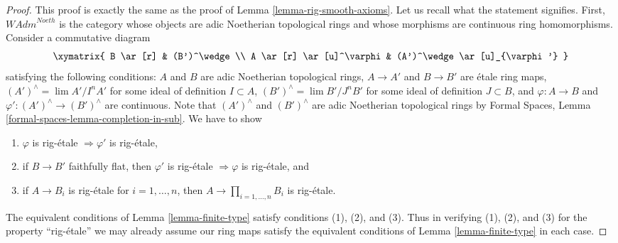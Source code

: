 \begin{proof}
This proof is exactly the same as the proof of
Lemma \ref{lemma-rig-smooth-axioms}.
Let us recall what the statement signifies. First, 
$\textit{WAdm}^{Noeth}$ is the category whose objects are
adic Noetherian topological rings and whose morphisms are
continuous ring homomorphisms. Consider a commutative diagram
$$
\xymatrix{
B \ar[r] & (B')^\wedge \\
A \ar[r] \ar[u]^\varphi & (A')^\wedge \ar[u]_{\varphi'}
}
$$
satisfying the following conditions:
$A$ and $B$ are adic Noetherian topological rings,
$A \to A'$ and $B \to B'$ are \'etale ring maps,
$(A')^\wedge = \lim A'/I^nA'$ for some ideal of definition $I \subset A$,
$(B')^\wedge = \lim B'/J^nB'$ for some ideal of definition $J \subset B$, and
$\varphi : A \to B$ and $\varphi' : (A')^\wedge \to (B')^\wedge$
are continuous. Note that $(A')^\wedge$ and $(B')^\wedge$ are
adic Noetherian topological rings by
Formal Spaces, Lemma \ref{formal-spaces-lemma-completion-in-sub}.
We have to show
\begin{enumerate}
\item $\varphi$ is rig-\'etale $\Rightarrow \varphi'$ is rig-\'etale,
\item if $B \to B'$ faithfully flat, then $\varphi'$ is rig-\'etale
$\Rightarrow \varphi$ is rig-\'etale, and
\item if $A \to B_i$ is rig-\'etale for $i = 1, \ldots, n$, then
$A \to \prod_{i = 1, \ldots, n} B_i$ is rig-\'etale.
\end{enumerate}
The equivalent conditions of Lemma \ref{lemma-finite-type} satisfy
conditions (1), (2), and (3).
Thus in verifying (1), (2), and (3) for the property
``rig-\'etale'' we may already assume our ring maps satisfy
the equivalent conditions of Lemma \ref{lemma-finite-type}
in each case.


\end{proof}
